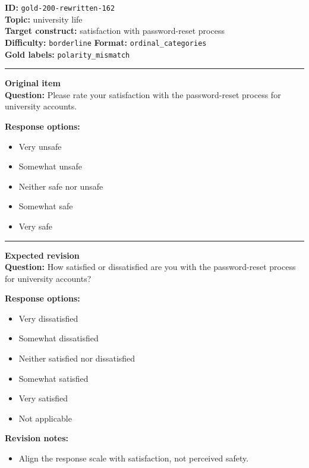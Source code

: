 \documentclass[10pt,a4paper]{article}
\newcommand{\sectionline}{\vspace{0.15em}\hrule\vspace{0.35em}}
\begin{document}
\begin{tcolorbox}[colframe=FlawRed,colback=white,colbacktitle=FlawRed!9,coltitle=black,title={Item 162\hfill Flawed item}]
\textbf{ID:} \texttt{gold-200-rewritten-162}\\
\textbf{Topic:} university life\\
\textbf{Target construct:} satisfaction with password-reset process\\
\textbf{Difficulty:} \texttt{borderline} \quad \textbf{Format:} \texttt{ordinal\_categories}\\
\textbf{Gold labels:} \texttt{polarity\_mismatch}\\
\sectionline
\textbf{Original item}\\
\textbf{Question:} Please rate your satisfaction with the password-reset process for university accounts.
\par\textbf{Response options:}
\begin{itemize}
\item Very unsafe
\item Somewhat unsafe
\item Neither safe nor unsafe
\item Somewhat safe
\item Very safe
\end{itemize}
\sectionline
\textbf{Expected revision}\\
\textbf{Question:} How satisfied or dissatisfied are you with the password-reset process for university accounts?
\par\textbf{Response options:}
\begin{itemize}
\item Very dissatisfied
\item Somewhat dissatisfied
\item Neither satisfied nor dissatisfied
\item Somewhat satisfied
\item Very satisfied
\item Not applicable
\end{itemize}
\par\textbf{Revision notes:}
\begin{itemize}
\item Align the response scale with satisfaction, not perceived safety.
\end{itemize}
\end{tcolorbox}
\end{document}
